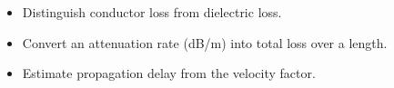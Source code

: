 \begin{objectives}
\begin{itemize}[leftmargin=1.4em,itemsep=2pt]
\item Distinguish conductor loss from dielectric loss.
\item Convert an attenuation rate (dB/m) into total loss over a length.
\item Estimate propagation delay from the velocity factor.
\end{itemize}
\end{objectives}
